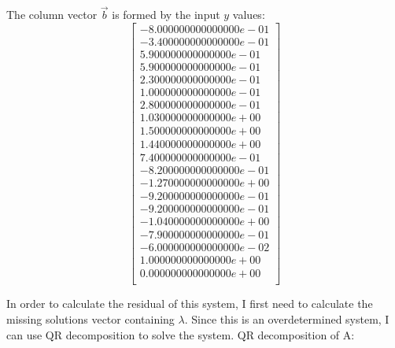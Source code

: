 \documentclass{article}
\begin{document}
The column vector $\vec{b}$ is formed by the input $y$ values:
$$
\begin{bmatrix} 
-8.000000000000000e-01\\
-3.400000000000000e-01\\
5.900000000000000e-01\\
5.900000000000000e-01\\
2.300000000000000e-01\\
1.000000000000000e-01\\
2.800000000000000e-01\\
1.030000000000000e+00\\
1.500000000000000e+00\\
1.440000000000000e+00\\
7.400000000000000e-01\\
-8.200000000000000e-01\\
-1.270000000000000e+00\\
-9.200000000000000e-01\\
-9.200000000000000e-01\\
-1.040000000000000e+00\\
-7.900000000000000e-01\\
-6.000000000000000e-02\\
1.000000000000000e+00\\
0.000000000000000e+00\\
\end{bmatrix}
$$

In order to calculate the residual of this system, I first need to calculate the missing solutions vector containing $\lambda$. Since this is an overdetermined system, I can use QR decomposition to solve the system. QR decomposition of A:
\end{document}
